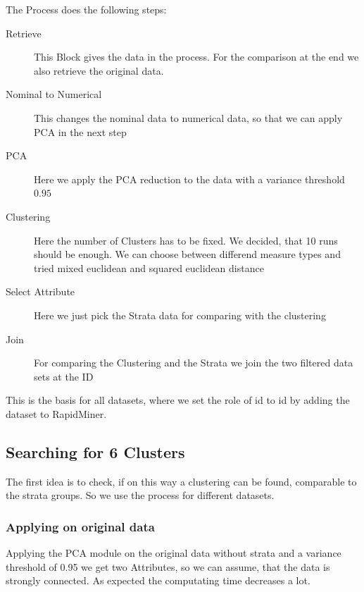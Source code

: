 The Process does the following steps:
\begin{description}
  \item[Retrieve] This Block gives the data in the process. For the comparison at the end we also retrieve the original data.
  \item[Nominal to Numerical] This changes the nominal data to numerical data, so that we can apply PCA in the next step
  \item[PCA] Here we apply the PCA reduction to the data with a variance threshold $0.95$
  \item[Clustering] Here the number of Clusters has to be fixed. We decided, that 10 runs should be enough. We can choose between differend measure types and tried mixed euclidean and squared euclidean distance
  \item[Select Attribute] Here we just pick the Strata data for comparing with the clustering
  \item[Join] For comparing the Clustering and the Strata we join the two filtered data sets at the ID
\end{description}

This is the basis for all datasets, where we set the role of id to id by adding the dataset to RapidMiner.

\subsection{Searching for 6 Clusters}

The first idea is to check, if on this way a clustering can be found, comparable to the strata groups. So we use the process for different datasets.

\subsubsection{Applying on original data}
Applying the PCA module on the original data without strata and a variance
threshold of 0.95 we get two Attributes, so we can assume, that the data is strongly connected. As expected the computating time decreases a lot. 

